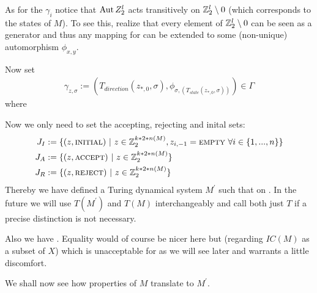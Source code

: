 As for the $\gamma_i$ notice that
$\operatorname{Aut} Z_2^l$ acts transitively on $\mathbb{Z}_2^l \setminus 0$ (which corresponds to the states of $M$).
To see this, realize that every element of $\mathbb{Z}_2^l \setminus 0$ can be seen as a generator and thus any mapping  for  can be extended to some (non-unique) automorphism $\phi_{x,y}$.

Now set
\begin{align*}
	\gamma_{z,\sigma} := (T_{direction}(z_{*,0},\sigma) , \phi_{\sigma,(T_{state}(z_{*,0},\sigma))}) \in \Gamma
\end{align*}
where 

Now we only need to set the accepting, rejecting and inital sets:
\begin{align*}
	J_I & := \{(z,\text{\scshape{initial}}) ~\vert~ z \in \mathbb{Z}_2^{k * 2 * n(M)} , z_{i,-1} = \text{\scshape{empty}} ~ \forall i \in \{1,...,n\}\} \\
	J_A & := \{(z,\text{\scshape{accept}}) ~\vert~ z \in \mathbb{Z}_2^{k * 2 * n(M)} \} \\
	J_R & := \{(z,\text{\scshape{reject}}) ~\vert~ z \in \mathbb{Z}_2^{k * 2 * n(M)} \} \\
\end{align*}
Thereby we have defined a Turing dynamical system $M^\prime$ such that  on .
In the future we will use $T(M^\prime)$ and $T(M)$ interchangeably and call both just $T$ if a precise distinction is not necessary.

Also we have .
Equality would of course be nicer here but (regarding $IC(M)$ as a subset of $X$)  which is unacceptable for  as we will see later and warrants a little discomfort.

We shall now see how properties of $M$ translate to $M^\prime$.
